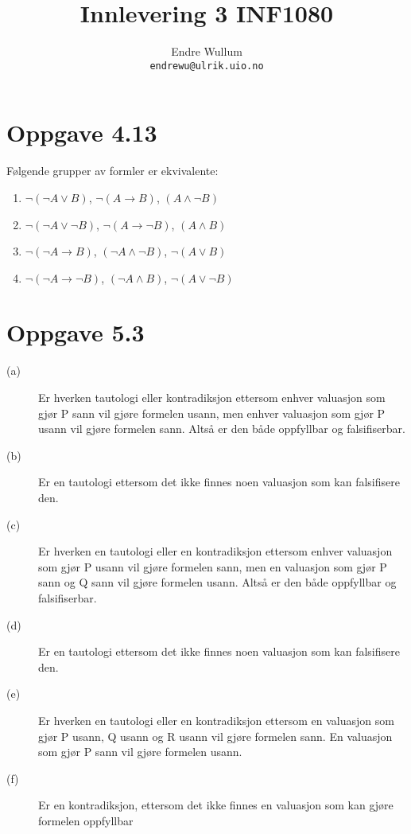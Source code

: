 \documentclass[12pt,norsk,a4paper]{article}
\title{Innlevering 3 INF1080}
\author{Endre Wullum\\ \texttt{endrewu@ulrik.uio.no}}
\begin{document}
\maketitle

\section*{Oppgave 4.13}
Følgende grupper av formler er ekvivalente:
\begin{enumerate}
\item $\neg (\neg A \lor B)$, $\neg (A \rightarrow B)$, $(A \land \neg B)$
\item $\neg (\neg A \lor \neg B)$, $\neg (A \rightarrow \neg B)$, $(A \land B)$
\item $\neg (\neg A \rightarrow B)$, $(\neg A \land \neg B)$, $\neg (A \lor B)$
\item $\neg (\neg A \rightarrow \neg B)$, $(\neg A \land B)$, $\neg (A \lor \neg B)$
\end{enumerate}

\section*{Oppgave 5.3}
\begin{description}
\item[(a)]Er hverken tautologi eller kontradiksjon ettersom enhver valuasjon som gjør P sann vil gjøre formelen usann, men enhver valuasjon som gjør P usann vil gjøre formelen sann. Altså er den både oppfyllbar og falsifiserbar.
\item[(b)]Er en tautologi ettersom det ikke finnes noen valuasjon som kan falsifisere den.
\item[(c)]Er hverken en tautologi eller en kontradiksjon ettersom enhver valuasjon som gjør P usann vil gjøre formelen sann, men en valuasjon som gjør P sann og Q sann vil gjøre formelen usann. Altså er den både oppfyllbar og falsifiserbar.
\item[(d)]Er en tautologi ettersom det ikke finnes noen valuasjon som kan falsifisere den.
\item[(e)]Er hverken en tautologi eller en kontradiksjon ettersom en valuasjon som gjør P usann, Q usann og R usann vil gjøre formelen sann. En valuasjon som gjør P sann vil gjøre formelen usann.
\item[(f)]Er en kontradiksjon, ettersom det ikke finnes en valuasjon som kan gjøre formelen oppfyllbar
\end{description}
\end{document}
